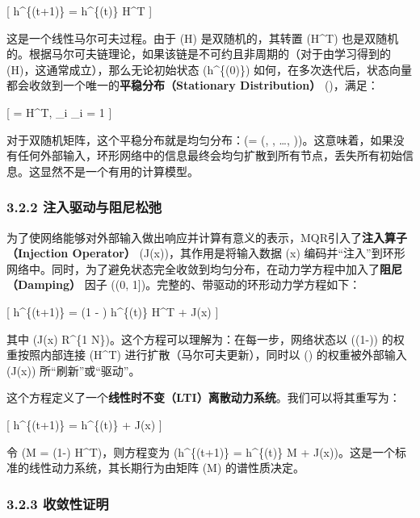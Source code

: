 \documentclass[
  12pt,
]{article}
\begin{document}
{[} h\^{}\{(t+1)\} = h\^{}\{(t)\} H\^{}T {]}

这是一个线性马尔可夫过程。由于 (H) 是双随机的，其转置 (H\^{}T)
也是双随机的。根据马尔可夫链理论，如果该链是不可约且非周期的（对于由学习得到的
(H)，这通常成立），那么无论初始状态 (h\^{}\{(0)\})
如何，在多次迭代后，状态向量都会收敛到一个唯一的\textbf{平稳分布（Stationary
Distribution）} (\pi)，满足：

{[} \pi = \pi H\^{}T, \quad \sum\_i \pi\_i = 1 {]}

对于双随机矩阵，这个平稳分布就是均匀分布：(\pi = (,
, \ldots,
))。这意味着，如果没有任何外部输入，环形网络中的信息最终会均匀扩散到所有节点，丢失所有初始信息。这显然不是一个有用的计算模型。

\hypertarget{ux6ce8ux5165ux9a71ux52a8ux4e0eux963bux5c3cux677eux5f1b}{%
\subsubsection{3.2.2
注入驱动与阻尼松弛}\label{ux6ce8ux5165ux9a71ux52a8ux4e0eux963bux5c3cux677eux5f1b}}

为了使网络能够对外部输入做出响应并计算有意义的表示，MQR引入了\textbf{注入算子（Injection
Operator）} (J(x))，其作用是将输入数据 (x)
编码并``注入''到环形网络中。同时，为了避免状态完全收敛到均匀分布，在动力学方程中加入了\textbf{阻尼（Damping）}
因子 (\alpha \in (0, 1{]})。完整的、带驱动的环形动力学方程如下：

{[} h\^{}\{(t+1)\} = (1 - \alpha) h\^{}\{(t)\} H\^{}T +
\alpha J(x) {]}

其中 (J(x) \in R\^{}\{1
\times N\})。这个方程可以理解为：在每一步，网络状态以 ((1-\alpha))
的权重按照内部连接 (H\^{}T) 进行扩散（马尔可夫更新），同时以 (\alpha)
的权重被外部输入 (J(x)) 所``刷新''或``驱动''。

这个方程定义了一个\textbf{线性时不变（LTI）离散动力系统}。我们可以将其重写为：

{[} h\^{}\{(t+1)\} = h\^{}\{(t)\}  +
\alpha J(x) {]}

令 (M = (1-\alpha) H\^{}T)，则方程变为 (h\^{}\{(t+1)\} = h\^{}\{(t)\} M
+ \alpha J(x))。这是一个标准的线性动力系统，其长期行为由矩阵
(M) 的谱性质决定。

\hypertarget{ux6536ux655bux6027ux8bc1ux660e}{%
\subsubsection{3.2.3 收敛性证明}\label{ux6536ux655bux6027ux8bc1ux660e}}
\end{document}
